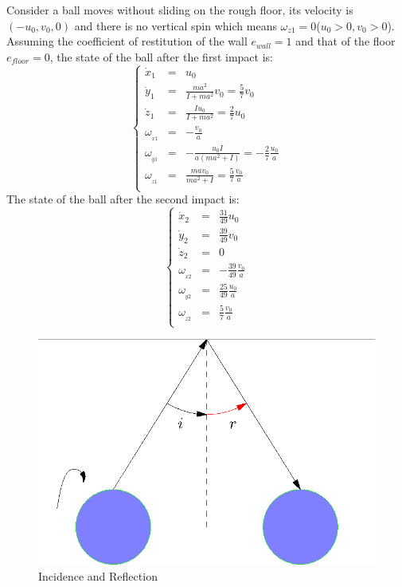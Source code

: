 \documentclass[preprint,12pt]{elsarticle}
\begin{document}
Consider a ball moves without sliding on the rough floor, its velocity is $(-u_0,v_0,0)$ and there is no vertical spin which means $\omega_{z1}=0$($u_0>0,v_0>0$). Assuming the coefficient of restitution of the wall $e_{wall}=1$ and that of the floor $e_{floor}=0$, the state of the ball after the first impact is:
\begin{equation}
\left\{\begin{array}{rcl}
    \dot{x}_1 & =&u_0 \\[6pt]
    \dot{y}_1 & =&\frac{ma^2}{I+ma^2}v_0=\frac{5}{7}v_0\\[6pt]
    \dot{z}_1 & =&\frac{Iu_0}{I+ma^2}=\frac{2}{7}u_0\\[6pt]
    \omega_{_{x1}} & =&-\frac{v_0}{a}\\[6pt]
    \omega_{_{y1}} & =&-\frac{u_0 I}{a\left(m a^2+I\right)}=-\frac{2}{7}\frac{u_0}{a}\\[6pt]
    \omega_{_{z1}} &=&\frac{m a v_0}{m a^2+I}=\frac{5}{7}\frac{v_0}{a}\\[6pt]
    \end{array}\right.
\end{equation}
The state of the ball after the second impact is:
\begin{equation}\label{eq:example}
\left\{\begin{array}{rcl}
    \dot{x}_2 & =&\frac{31}{49}u_0 \\[6pt]
    \dot{y}_2 & =&\frac{39}{49}v_0 \\[6pt]
    \dot{z}_2 & =&0\\[6pt]
    \omega_{_{x2}} & =&-\frac{39}{49}\frac{v_0}{a}\\[6pt]
    \omega_{_{y2}} & =&\frac{25}{49}\frac{u_0}{a}\\[6pt]
    \omega_{_{z2}} &=&\frac{5}{7}\frac{v_0}{a}\\[6pt]
    \end{array}\right.
\end{equation}

\begin{figure}[!htb]
\centering
\includegraphics[scale=0.8]{billiardimpact}
\caption{Incidence and Reflection} \label{figure:incidence_reflection}
\end{figure}
\end{document}
